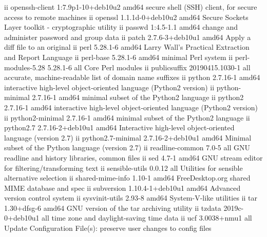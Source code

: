 ii  openssh-client             1:7.9p1-10+deb10u2          amd64        secure shell (SSH) client, for secure access to remote machines
ii  openssl                    1.1.1d-0+deb10u2            amd64        Secure Sockets Layer toolkit - cryptographic utility
ii  passwd                     1:4.5-1.1                   amd64        change and administer password and group data
ii  patch                      2.7.6-3+deb10u1             amd64        Apply a diff file to an original
ii  perl                       5.28.1-6                    amd64        Larry Wall's Practical Extraction and Report Language
ii  perl-base                  5.28.1-6                    amd64        minimal Perl system
ii  perl-modules-5.28          5.28.1-6                    all          Core Perl modules
ii  publicsuffix               20190415.1030-1             all          accurate, machine-readable list of domain name suffixes
ii  python                     2.7.16-1                    amd64        interactive high-level object-oriented language (Python2 version)
ii  python-minimal             2.7.16-1                    amd64        minimal subset of the Python2 language
ii  python2                    2.7.16-1                    amd64        interactive high-level object-oriented language (Python2 version)
ii  python2-minimal            2.7.16-1                    amd64        minimal subset of the Python2 language
ii  python2.7                  2.7.16-2+deb10u1            amd64        Interactive high-level object-oriented language (version 2.7)
ii  python2.7-minimal          2.7.16-2+deb10u1            amd64        Minimal subset of the Python language (version 2.7)
ii  readline-common            7.0-5                       all          GNU readline and history libraries, common files
ii  sed                        4.7-1                       amd64        GNU stream editor for filtering/transforming text
ii  sensible-utils             0.0.12                      all          Utilities for sensible alternative selection
ii  shared-mime-info           1.10-1                      amd64        FreeDesktop.org shared MIME database and spec
ii  subversion                 1.10.4-1+deb10u1            amd64        Advanced version control system
ii  sysvinit-utils             2.93-8                      amd64        System-V-like utilities
ii  tar                        1.30+dfsg-6                 amd64        GNU version of the tar archiving utility
ii  tzdata                     2019c-0+deb10u1             all          time zone and daylight-saving time data
ii  ucf                        3.0038+nmu1                 all          Update Configuration File(s): preserve user changes to config files
